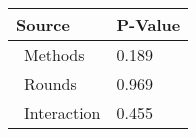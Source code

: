 
\centering
\begin{tabular}{ll}
\toprule
          Source & P-Value \\
\midrule
    \    Methods &   0.189 \\
     \    Rounds &   0.969 \\
\    Interaction &   0.455 \\
\bottomrule
\end{tabular}
